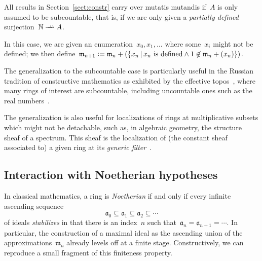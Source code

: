 \documentclass[com,11pt,crcready]{iosart2x}
\theoremstyle{definition}
\theoremstyle{plain}
\theoremstyle{remark}
\newcommand{\?}{\,{:}\,}
\newcommand{\aaa}{\mathfrak{a}}
\newcommand{\mmm}{\mathfrak{m}}
\newcommand{\NN}{\mathbb{N}}
\newcommand{\defeq}{\vcentcolon=}
\renewcommand{\_}{\mathpunct{.}\,}
\begin{document}
\newcommand{\rightrightharpoonup}{\mathrel{\mathrlap{\rightharpoonup}\mkern1mu\rightharpoonup}}
All results in Section~\ref{sect:constr} carry over mutatis mutandis if~$A$ is
only assumed to be subcountable, that is, if we are only
given a \emph{partially defined} surjection~$\NN \rightrightharpoonup A$.

In
this case, we are given an enumeration~$x_0,x_1,\ldots$ where some~$x_i$
might not be defined; we then define~$\mmm_{n+1} \defeq
\mmm_n + (\{ x_n \,|\, \text{$x_n$ is defined} \wedge 1 \not\in \mmm_n + (x_n) \})$.

The generalization to the subcountable case is particularly useful in the
Russian tradition of constructive mathematics as exhibited by the ef{}fective
topos~\cite{hyland:effective-topos,oosten:realizability,phoa:effective,bauer:c2c},
where many rings of interest are subcountable, including uncountable ones such as the real
numbers~\cite[Prop.~7.2]{hyland:effective-topos}.

The generalization is also useful for
localizations of rings at multiplicative subsets which might not be detachable,
such as, in algebraic geometry, the structure sheaf of a spectrum. This sheaf
is the localization of (the constant sheaf associated to) a given ring at its
\emph{generic filter}~\cite[Section~3.3]{blechschmidt:generalized-spaces}.


\subsection{Interaction with Noetherian hypotheses}

In classical mathematics, a ring is \emph{Noetherian} if and only if every
infinite ascending sequence
\[ \aaa_0 \subseteq \aaa_1 \subseteq \aaa_2 \subseteq \cdots \]
of ideals \emph{stabilizes} in that there is an index~$n$ such that~$\aaa_n =
\aaa_{n+1} = \cdots$. In particular, the construction of a maximal ideal as the
ascending union of the approximations~$\mmm_n$ already levels off at a finite
stage. Constructively, we can reproduce a small fragment of this
finiteness property.
\end{document}
